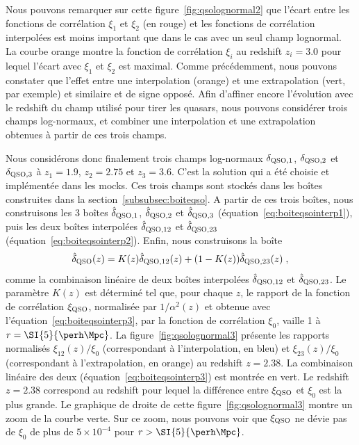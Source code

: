 Nous pouvons remarquer sur cette figure~\ref{fig:qsolognormal2} que l'écart entre les fonctions de corrélation $\xi_1$ et $\xi_2$ (en rouge) et les fonctions de corrélation interpolées est moins important que dans le cas avec un seul champ lognormal. La courbe orange montre la fonction de corrélation $\xi_i$ au redshift $z_i = \num{3.0}$ pour lequel l'écart avec $\xi_1$ et $\xi_2$ est maximal.
Comme précédemment, nous pouvons constater que l'effet entre une interpolation (orange) et une extrapolation (vert, par exemple) et similaire et de signe opposé. Afin d'affiner encore l'évolution avec le redshift du champ utilisé pour tirer les quasars, nous pouvons considérer trois champs log-normaux, et combiner une interpolation et une extrapolation obtenues à partir de ces trois champs.

Nous considérons donc finalement trois champs log-normaux $\delta_{\textsc{QSO},1}$, $\delta_{\textsc{QSO},2}$ et $\delta_{\textsc{QSO},3}$  à $z_1 = \num{1.9}$,  $z_2 = \num{2.75}$  et $z_3 = \num{3.6}$. C'est la solution qui a été choisie et implémentée dans les mocks. Ces trois champs sont stockés dans les boîtes construites dans la section~\ref{subsubsec:boiteqso}. A partir de ces trois boîtes, nous construisons les 3 boîtes $\hat \delta_{\textsc{QSO},1}$, $\hat \delta_{\textsc{QSO},2}$ et $\hat \delta_{\textsc{QSO},3}$ (équation~\ref{eq:boiteqsointerp1}), puis les deux boîtes interpolées $\hat \delta_{\textsc{QSO},12}$ et $\hat \delta_{\textsc{QSO},23}$ (équation~\ref{eq:boiteqsointerp2}). Enfin, nous construisons la boîte
\begin{equation}
  \label{eq:boiteqsointerp3}
  \hat \delta_{\textsc{QSO}}(z) = K(z) \hat \delta_{\textsc{QSO}, 12}(z) + (1 - K(z)) \hat \delta_{\textsc{QSO}, 23}(z) \; ,
\end{equation}
comme la combinaison linéaire de deux boîtes interpolées $\hat \delta_{\textsc{QSO},12}$ et $\hat \delta_{\textsc{QSO},23}$. Le paramètre $K(z)$ est déterminé tel que, pour chaque $z$, le rapport de la fonction de corrélation $\xi_{\textsc{QSO}}$, normalisée par $1/\alpha^2(z)$ et obtenue avec l'équation~\ref{eq:boiteqsointerp3}, par la fonction de corrélation $\xi_0$, vaille 1 à $r = \SI{5}{\perh\Mpc}$. La figure~\ref{fig:qsolognormal3} présente les rapports normalisés $\xi_{12}(z) / \xi_0$ (correspondant à l'interpolation, en bleu) et $\xi_{23}(z) / \xi_0$ (correspondant à l'extrapolation, en orange) au redshift $z = \num{2.38}$. La combinaison linéaire des deux (équation~\ref{eq:boiteqsointerp3}) est montrée en vert. Le redshift $z = \num{2.38}$ correspond au redshift pour lequel la différence entre $\xi_{\textsc{QSO}}$ et $\xi_0$ est la plus grande. Le graphique de droite de cette figure~\ref{fig:qsolognormal3} montre un zoom de la courbe verte. Sur ce zoom, nous pouvons voir que $\xi_{\textsc{QSO}}$ ne dévie pas de $\xi_0$ de plus de $5\times 10^{-4}$ pour $r > \SI{5}{\perh\Mpc}$.
